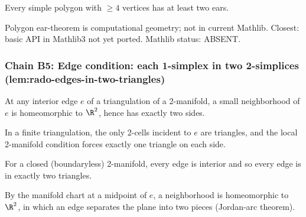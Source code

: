\begin{lemma}
\label{lem:rcs-r4}
Every simple polygon with $\geq 4$ vertices has at least two ears.
\leanok
\end{lemma}

\begin{lemma}
\label{lem:rcs-r5}
Polygon ear-theorem is computational geometry; not in current Mathlib.  Closest:  basic API in Mathlib3 not yet ported.  Mathlib status: ABSENT.
\leanok
\end{lemma}

\subsubsection*{Chain B5: Edge condition: each 1-simplex in two 2-simplices (lem:rado-edges-in-two-triangles)}

\begin{lemma}
\label{lem:ret-r1}
At any interior edge $e$ of a triangulation of a 2-manifold, a small neighborhood of $e$ is homeomorphic to $\R^{2}$, hence has exactly two sides.
\leanok
\end{lemma}

\begin{lemma}
\label{lem:ret-r2}
In a finite triangulation, the only 2-cells incident to $e$ are triangles, and the local 2-manifold condition forces exactly one triangle on each side.
\leanok
\end{lemma}

\begin{lemma}
\label{lem:ret-r3}
For a closed (boundaryless) 2-manifold, every edge is interior and so every edge is in exactly two triangles.
\leanok
\end{lemma}

\begin{lemma}
\label{lem:ret-r4}
By the manifold chart at a midpoint of $e$, a neighborhood is homeomorphic to $\R^{2}$, in which an edge separates the plane into two pieces (Jordan-arc theorem).
\leanok
\end{lemma}

